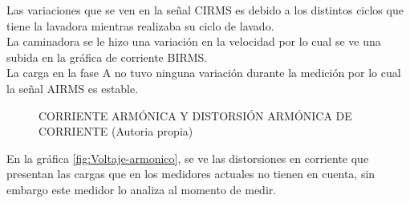       Las variaciones que se ven en la señal CIRMS es debido a los distintos ciclos que tiene la lavadora mientras realizaba su ciclo de lavado. \\
      La caminadora se le hizo una variación en la velocidad por lo cual se ve una subida en la gráfica de corriente BIRMS.\\
      La carga en la fase A no tuvo ninguna variación durante la medición por lo cual la señal AIRMS es estable.\\
    \begin{figure}[H]
      \hfill
      \hfill
      \hfill
      \caption{CORRIENTE ARMÓNICA Y DISTORSIÓN ARMÓNICA DE CORRIENTE (Autoria propia)}
      \label{fig:corriente-armonica}
      \end{figure}
      En la gráfica \ref{fig:Voltaje-armonico}, se ve las distorsiones en corriente que presentan las cargas que en los medidores actuales no tienen en cuenta, sin embargo este medidor lo analiza al momento de medir.
